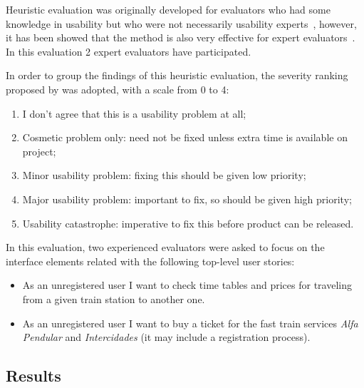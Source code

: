 \documentclass[a4paper]{article}
\begin{document}
Heuristic evaluation was originally developed for evaluators who had some knowledge in usability but who were not necessarily usability experts~\citep{nielsen1990heuristic}, however, it has been showed that the method is also very effective for expert evaluators~\citep{nielsen1992finding}. In this evaluation 2 expert evaluators have participated.

In order to group the findings of this heuristic evaluation, the severity ranking proposed by \citet{nielsen1995rating} was adopted, with a scale from 0 to 4:

\begin{enumerate}[start=0, label={\theenumi{} -}]
\item I don't agree that this is a usability problem at all;
\item Cosmetic problem only: need not be fixed unless extra time is available on project;
\item Minor usability problem: fixing this should be given low priority;
\item Major usability problem: important to fix, so should be given high priority;
\item Usability catastrophe: imperative to fix this before product can be released.
\end{enumerate}

In this evaluation, two experienced evaluators were asked to focus on the interface elements related with the following top-level user stories:
\begin{itemize}
  \item As an unregistered user I want to check time tables and prices for traveling from a given train station to another one.
  \item As an unregistered user I want to buy a ticket for the fast train services \textit{Alfa Pendular} and \textit{Intercidades} (it may include a registration process).
\end{itemize}

\subsection{Results}
\end{document}
